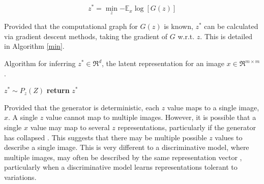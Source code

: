 \documentclass[journal]{IEEEtran}
\begin{document}
\begin{equation} \label{cost}
    z^* = \min_z   {- \mathbb E}_x \log[G(z)] 
\end{equation}

Provided that the computational graph for $G(z)$ is known, $z^*$ can be calculated via gradient descent methods, taking the gradient of $G$ w.r.t. $z$. This is detailed in Algorithm \ref{min}.


  
    

\begin{algorithm}

\caption{Algorithm for inferring $z^* \in \Re^d$, the latent representation for an image $x \in \Re^{m \times m}$.}\label{min}
$z^* \sim P_z(Z)$ \;
\textbf{return} $z^*$ \;

\end{algorithm}

Provided that the generator is deterministic, each $z$ value maps to a single image, $x$. A single $z$ value cannot map to multiple images. However, it is possible that a single $x$ value may map to several $z$ representations, particularly if the generator has collapsed \cite{salimans2016improved}. This suggests that there may be multiple possible $z$ values to describe a single image. This is very different to a discriminative model, where multiple images, may often be described by the same representation vector \cite{mahendran2015understanding}, particularly when a discriminative model learns representations tolerant to variations.
\end{document}
